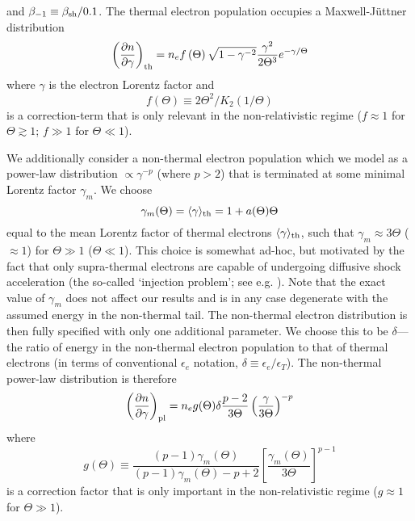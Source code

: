 \documentclass[twocolumn]{aastex63}
\begin{document}
and $\beta_{-1} \equiv \beta_{\rm sh}/0.1$.
The thermal electron population occupies a Maxwell-J\"{u}ttner distribution 
\begin{equation}
\label{eq:dn_dgamma_th}
    \left(\frac{\partial n}{\partial \gamma}\right)_{\rm th}
    = n_e f\left(\Theta\right) \sqrt{1-\gamma^{-2}} \frac{\gamma^2}{2 \Theta^3} e^{-\gamma/\Theta}
\end{equation}
where $\gamma$ is the electron Lorentz factor
and
\begin{equation}
    f(\Theta) \equiv 2\Theta^2/K_2(1/\Theta)
\end{equation}
is a correction-term that is only relevant in the non-relativistic regime ($f \approx 1$ for $\Theta \gtrsim 1$; $f \gg 1$ for $\Theta \ll 1$).

We additionally consider a non-thermal electron population which we model as a power-law distribution $\propto \gamma^{-p}$ (where $p>2$) that is terminated at some minimal Lorentz factor $\gamma_m$. We choose
\begin{equation}
\label{eq:gamma_m}
    \gamma_m(\Theta) = \langle \gamma \rangle_{\rm th} = 1+a(\Theta)\Theta
\end{equation}
equal to the mean Lorentz factor of thermal electrons $\langle \gamma \rangle_{\rm th}$, such that $\gamma_m \approx 3 \Theta$ ($\approx 1$) for $\Theta \gg 1$ ($\Theta \ll 1$). This choice is somewhat ad-hoc, but motivated by the fact that only supra-thermal electrons are capable of undergoing diffusive shock acceleration (the so-called `injection problem'; see e.g. \citealt{BlandfordEichler87}). 
Note that the exact value of $\gamma_m$ does not affect our results and is in any case degenerate with the assumed energy in the non-thermal tail.  The non-thermal electron distribution is then fully specified with only one additional parameter. We choose this to be $\delta$---the ratio of energy in the non-thermal electron population to that of thermal electrons (in terms of conventional $\epsilon_e$ notation, $\delta \equiv \epsilon_e/\epsilon_T$).
The non-thermal power-law distribution is therefore
\begin{equation}
    \left(\frac{\partial n}{\partial \gamma}\right)_{\rm pl}
    =
    n_e g(\Theta) \delta \frac{p-2}{3\Theta} \left(\frac{\gamma}{3\Theta}\right)^{-p}
\end{equation}
where 
\begin{equation}
    g(\Theta) \equiv \frac{(p-1) \gamma_m(\Theta) }{ (p-1)\gamma_m(\Theta)-p+2 } \left[\frac{\gamma_m(\Theta)}{3\Theta}\right]^{p-1}
\end{equation}
is a correction factor that is only important in the non-relativistic regime ($g \approx 1$ for $\Theta \gg 1$). 
\end{document}
